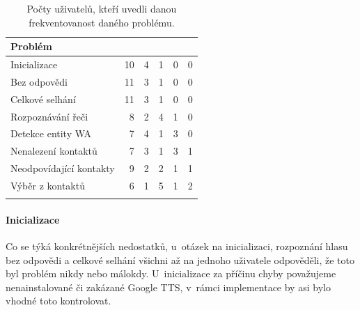 \begin{table}[b!]

    \centering

    \begin{tabular}{l@{\hspace{1.5cm}}D{.}{,}{3.2}D{.}{,}{1.2}D{.}{,}{2.3}D{.}{,}{2.3}D{.}{,}{2.3}}
        \toprule
        \textbf{Problém}        &  &  &  &  &  \\
        \midrule
        Inicializace            & 10         & 4            & 1          & 0          & 0         \\
        Bez odpovědi            & 11         & 3            & 1          & 0          & 0         \\
        Celkové selhání         & 11         & 3            & 1          & 0          & 0         \\
        Rozpoznávání řeči       & 8          & 2            & 4          & 1          & 0         \\
        Detekce entity WA       & 7          & 4            & 1          & 3          & 0         \\
        Nenalezení kontaktů     & 7          & 3            & 1          & 3          & 1         \\
        Neodpovídající kontakty & 9          & 2            & 2          & 1          & 1         \\
        Výběr z kontaktů        & 6          & 1            & 5          & 1          & 2         \\
        \bottomrule
    \end{tabular}

    \caption{Počty uživatelů, kteří uvedli danou frekventovanost daného problému.}\label{tab-results}

\end{table}

\paragraph{Inicializace} Co se týká konkrétnějších nedostatků, u~otázek na inicializaci, rozpoznání
hlasu bez odpovědi a celkové selhání všichni až na jednoho uživatele odpověděli,
že toto byl problém nikdy nebo málokdy. U~inicializace za příčinu
chyby považujeme nenainstalované či zakázané Google TTS, v~rámci
implementace by asi bylo vhodné toto kontrolovat.

